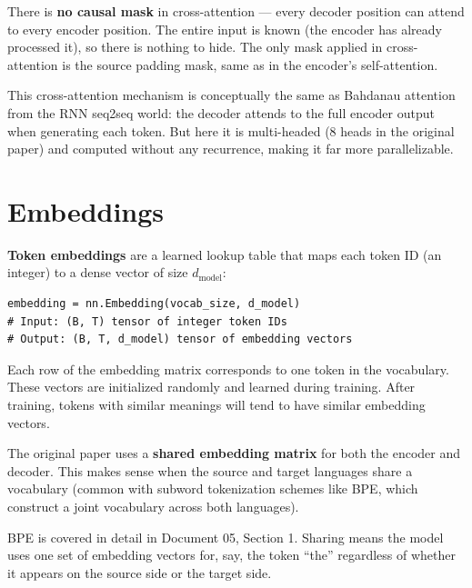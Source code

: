 There is \textbf{no causal mask} in cross-attention --- every decoder position can attend to every encoder position. The entire input is known (the encoder has already processed it), so there is nothing to hide. The only mask applied in cross-attention is the source padding mask, same as in the encoder's self-attention.

This cross-attention mechanism is conceptually the same as Bahdanau attention from the RNN seq2seq world: the decoder attends to the full encoder output when generating each token. But here it is multi-headed (8 heads in the original paper) and computed without any recurrence, making it far more parallelizable.

\section{Embeddings}

\textbf{Token embeddings} are a learned lookup table that maps each token ID (an integer) to a dense vector of size $d_{\text{model}}$:

\concepttag
\begin{lstlisting}
embedding = nn.Embedding(vocab_size, d_model)
# Input: (B, T) tensor of integer token IDs
# Output: (B, T, d_model) tensor of embedding vectors
\end{lstlisting}

Each row of the embedding matrix corresponds to one token in the vocabulary. These vectors are initialized randomly and learned during training. After training, tokens with similar meanings will tend to have similar embedding vectors.

The original paper uses a \textbf{shared embedding matrix} for both the encoder and decoder. This makes sense when the source and target languages share a vocabulary (common with subword tokenization schemes like BPE, which construct a joint vocabulary across both languages).

BPE is covered in detail in Document 05, Section 1. Sharing means the model uses one set of embedding vectors for, say, the token ``the'' regardless of whether it appears on the source side or the target side.

